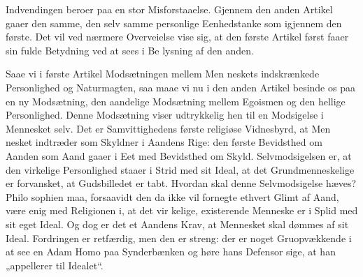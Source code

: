 \documentclass[12pt]{book}
\begin{document}
Indvendingen beroer paa en stor Misforstaaelse.
Gjennem den anden Artikel gaaer den samme, den selv\-%
samme personlige Eenhedstanke som igjennem den første.
Det vil ved nærmere Overveielse vise sig, at den første
Artikel først faaer sin fulde Betydning ved at sees i Be\-%
lysning af den anden.

Saae vi i første Artikel Modsætningen mellem Men\-%
neskets indskrænkede Personlighed og Naturmagten, saa
maae vi nu i den anden Artikel besinde os paa en ny
Modsætning, den aandelige Modsætning mellem Egoismen
og den hellige Personlighed. Denne Modsætning viser
udtrykkelig hen til en Modsigelse i Mennesket selv. Det
er Samvittighedens første religiøse Vidnesbyrd, at Men\-%
nesket indtræder som Skyldner i Aandens Rige: den
første Bevidsthed om Aanden som Aand gaaer i Eet
med Bevidsthed om Skyld. Selvmodsigelsen er, at den
virkelige Personlighed staaer i Strid med sit Ideal, at
det Grundmenneskelige er forvansket, at Gudsbilledet er
tabt. Hvordan skal denne Selvmodsigelse hæves? Philo\-%
sophien maa, forsaavidt den da ikke vil fornegte ethvert
Glimt af Aand, være enig med Religionen i, at det vir\-%
kelige, existerende Menneske er i Splid med sit eget
Ideal. Og dog er det et Aandens Krav, at Mennesket
skal dømmes af sit Ideal. Fordringen er retfærdig, men
den er streng: der er noget Gruopvækkende i at see en
Adam Homo paa Synderbænken og høre hans Defensor
sige, at han „appellerer til Idealet“.
\end{document}
